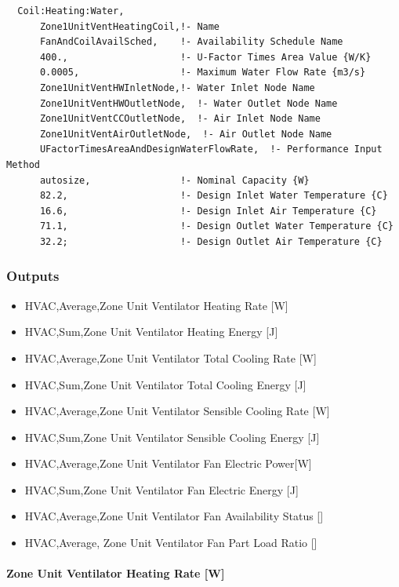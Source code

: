 \begin{lstlisting}
  Coil:Heating:Water,
      Zone1UnitVentHeatingCoil,!- Name
      FanAndCoilAvailSched,    !- Availability Schedule Name
      400.,                    !- U-Factor Times Area Value {W/K}
      0.0005,                  !- Maximum Water Flow Rate {m3/s}
      Zone1UnitVentHWInletNode,!- Water Inlet Node Name
      Zone1UnitVentHWOutletNode,  !- Water Outlet Node Name
      Zone1UnitVentCCOutletNode,  !- Air Inlet Node Name
      Zone1UnitVentAirOutletNode,  !- Air Outlet Node Name
      UFactorTimesAreaAndDesignWaterFlowRate,  !- Performance Input Method
      autosize,                !- Nominal Capacity {W}
      82.2,                    !- Design Inlet Water Temperature {C}
      16.6,                    !- Design Inlet Air Temperature {C}
      71.1,                    !- Design Outlet Water Temperature {C}
      32.2;                    !- Design Outlet Air Temperature {C}
\end{lstlisting}

\subsubsection{Outputs}\label{outputs-2-028}

\begin{itemize}
\item
  HVAC,Average,Zone Unit Ventilator Heating Rate {[}W{]}
\item
  HVAC,Sum,Zone Unit Ventilator Heating Energy {[}J{]}
\item
  HVAC,Average,Zone Unit Ventilator Total Cooling Rate {[}W{]}
\item
  HVAC,Sum,Zone Unit Ventilator Total Cooling Energy {[}J{]}
\item
  HVAC,Average,Zone Unit Ventilator Sensible Cooling Rate {[}W{]}
\item
  HVAC,Sum,Zone Unit Ventilator Sensible Cooling Energy {[}J{]}
\item
  HVAC,Average,Zone Unit Ventilator Fan Electric Power{[}W{]}
\item
  HVAC,Sum,Zone Unit Ventilator Fan Electric Energy {[}J{]}
\item
  HVAC,Average,Zone Unit Ventilator Fan Availability Status {[]}
\item
  HVAC,Average, Zone Unit Ventilator Fan Part Load Ratio {[]}
\end{itemize}

\paragraph{Zone Unit Ventilator Heating Rate {[}W{]}}\label{zone-unit-ventilator-heating-rate-w}


